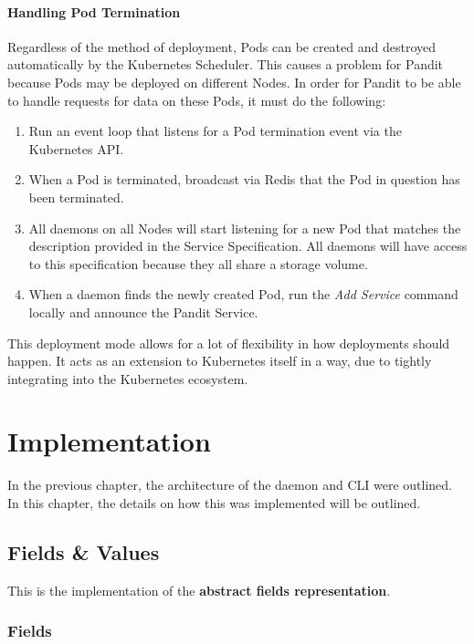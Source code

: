 \documentclass[a4paper,12pt]{report}
\begin{document}
\subsubsection{Handling Pod Termination}
Regardless of the method of deployment, Pods can be created and destroyed automatically by the Kubernetes Scheduler.
This causes a problem for Pandit because Pods may be deployed on different Nodes. In order for Pandit to be able to handle requests for data on these Pods,
it must do the following:

\begin{enumerate}
    \item Run an event loop that listens for a Pod termination event via the Kubernetes API.
    \item When a Pod is terminated, broadcast via Redis that the Pod in question has been terminated.
    \item All daemons on all Nodes will start listening for a new Pod that matches the description provided in the Service Specification. All daemons will have access to this specification because they all share a storage volume.
    \item When a daemon finds the newly created Pod, run the \textit{Add Service} command locally and announce the Pandit Service.
\end{enumerate}

This deployment mode allows for a lot of flexibility in how deployments should happen. It acts as an extension to Kubernetes itself in a way, due to tightly integrating into the Kubernetes ecosystem.

\chapter{Implementation}

In the previous chapter, the architecture of the daemon and CLI were outlined. In this chapter, the details on how this was implemented will be outlined.
\section{Fields \& Values}
\label{sec:fv}

This is the implementation of the \textbf{abstract fields representation}.

\subsection{Fields}
\end{document}
